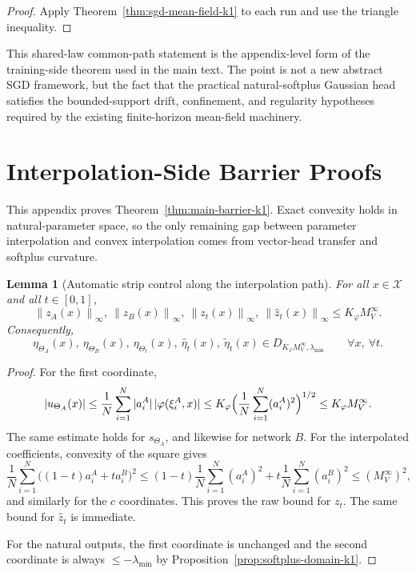 \documentclass[11pt]{article}
\newtheorem{lemma}[theorem]{Lemma}
\theoremstyle{definition}
\newcommand{\norm}[1]{\left\lVert #1 \right\rVert}
\newcommand{\mc}[1]{\mathcal{#1}}
\begin{document}
\begin{proof}
Apply Theorem~\ref{thm:sgd-mean-field-k1} to each run and use the triangle
inequality.
\end{proof}

This shared-law common-path statement is the appendix-level form of the
training-side theorem used in the main text. The point is not a new abstract
SGD framework, but the fact that the practical natural-softplus Gaussian head
satisfies the bounded-support drift, confinement, and regularity hypotheses
required by the existing finite-horizon mean-field machinery.

\section{Interpolation-Side Barrier Proofs}

This appendix proves Theorem~\ref{thm:main-barrier-k1}. Exact convexity holds
in natural-parameter space, so the only remaining gap between parameter
interpolation and convex interpolation comes from vector-head transfer and
softplus curvature.

\begin{lemma}[Automatic strip control along the interpolation path]
\label{lem:auto-strip-k1}
For all $x\in\mc{X}$ and all $t\in[0,1]$,
\[
  \norm{z_A(x)}_\infty,\ \norm{z_B(x)}_\infty,\ \norm{z_t(x)}_\infty,\
  \norm{\hat z_t(x)}_\infty
  \le
  K_\varphi M_V^\infty.
\]
Consequently,
\[
  \eta_{\Theta_A}(x),\ \eta_{\Theta_B}(x),\ \eta_{\Theta_t}(x),\
  \hat\eta_t(x),\ \tilde\eta_t(x)
  \in
  D_{K_\varphi M_V^\infty,\lambda_{\min}}
  \qquad
  \forall x,\ \forall t.
\]
\end{lemma}

\begin{proof}
For the first coordinate,
\[
  |u_{\Theta_A}(x)|
  \le
  \frac1N\sum_{i=1}^N |a_i^A|\,|\varphi(\xi_i^A,x)|
  \le
  K_\varphi
  \Bigl(\frac1N\sum_{i=1}^N (a_i^A)^2\Bigr)^{1/2}
  \le
  K_\varphi M_V^\infty.
\]
The same estimate holds for $s_{\Theta_A}$, and likewise for network $B$.
For the interpolated coefficients, convexity of the square gives
\[
  \frac1N\sum_{i=1}^N \bigl((1-t)a_i^A+ta_i^B\bigr)^2
  \le
  (1-t)\frac1N\sum_{i=1}^N (a_i^A)^2
  +
  t\frac1N\sum_{i=1}^N (a_i^B)^2
  \le
  (M_V^\infty)^2,
\]
and similarly for the $c$ coordinates. This proves the raw bound for $z_t$.
The same bound for $\hat z_t$ is immediate.

For the natural outputs, the first coordinate is unchanged and the second
coordinate is always $\le -\lambda_{\min}$ by
Proposition~\ref{prop:softplus-domain-k1}.
\end{proof}
\end{document}
